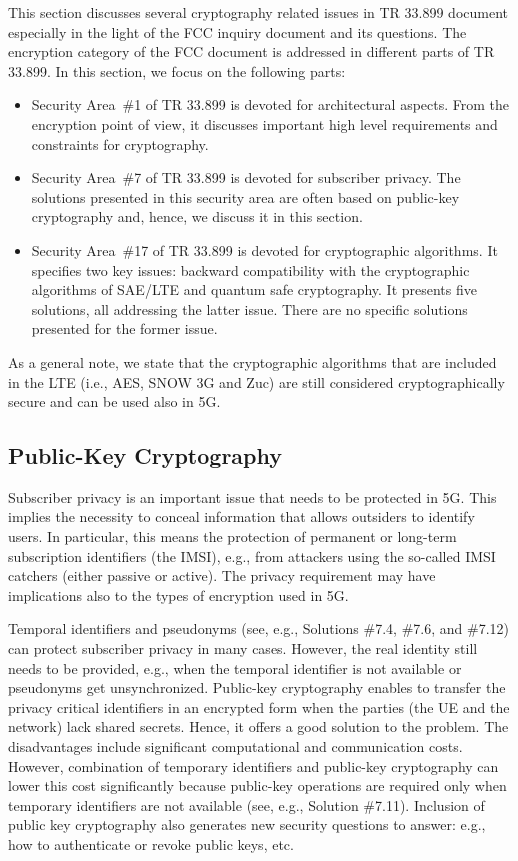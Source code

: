 \documentclass[lnicst,sechang,a4paper]{svmultln}
\begin{document}
This section discusses several cryptography related issues in TR 33.899 document especially in the light of the FCC inquiry document and its questions. The encryption category of the FCC document is addressed in different parts of TR 33.899. In this section, we focus on the following parts:
\begin{itemize}
\item Security Area~\#1 of TR 33.899 is devoted for architectural aspects. From the encryption point of view, it discusses important high level requirements and constraints for cryptography.
\item Security Area~\#7 of TR 33.899 is devoted for subscriber privacy. The solutions presented in this security area are often based on public-key cryptography and, hence, we discuss it in this section.
\item Security Area~\#17 of TR 33.899 is devoted for cryptographic algorithms. It specifies two key issues: backward compatibility with the cryptographic algorithms of SAE/LTE and quantum safe cryptography. It presents five solutions, all addressing the latter issue. There are no specific solutions presented for the former issue.  
\end{itemize}

As a general note, we state that the cryptographic algorithms that are included in the LTE (i.e., AES, SNOW 3G and Zuc) are still considered cryptographically secure and can be used also in 5G.

\subsection{Public-Key Cryptography}
\label{sec:pkc}

Subscriber privacy is an important issue that needs to be protected in 5G. This implies the necessity to conceal information that allows outsiders to identify users. In particular, this means the protection of permanent or long-term subscription identifiers (the IMSI), e.g., from attackers using the so-called IMSI catchers (either passive or active). The privacy requirement may have implications also to the types of encryption used in 5G.

Temporal identifiers and pseudonyms (see, e.g., Solutions \#7.4, \#7.6, and \#7.12) can protect subscriber privacy in many cases. However, the real identity still needs to be provided, e.g., when the temporal identifier is not available or pseudonyms get unsynchronized. Public-key cryptography enables to transfer the privacy critical identifiers in an encrypted form when the parties (the UE and the network) lack shared secrets. Hence, it offers a good solution to the problem. The disadvantages include significant computational and communication costs. However, combination of temporary identifiers and public-key cryptography can lower this cost significantly because public-key operations are required only when temporary identifiers are not available (see, e.g., Solution \#7.11). Inclusion of public key cryptography also generates new security questions to answer: e.g., how to authenticate or revoke public keys, etc.
\end{document}
